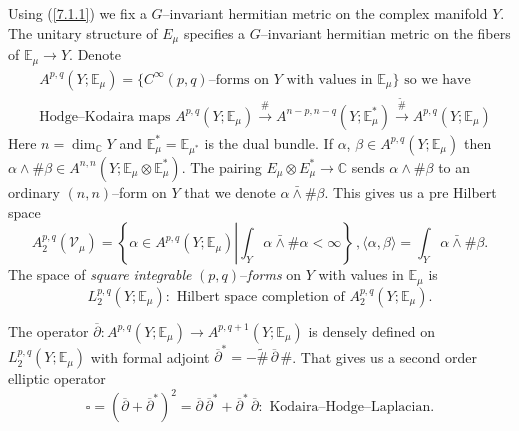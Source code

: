 \documentclass{conm-p-l}
\def\C{\mathbb{C}}
\def\E{\mathbb{E}}
\def\cV{\mathcal{V}}
\begin{document}
Using (\ref{7.1.1}) we fix a $G$--invariant hermitian metric on the complex
manifold $Y$.  The unitary structure of $E_\mu$ specifies a
$G$--invariant hermitian metric on the fibers of $\E_\mu \to Y$.  Denote
\begin{equation}\label{7.1.5}
\begin{aligned}
&A^{p,q}(Y;\E_\mu) = \{ C^\infty (p,q)\text{--forms on }
	Y \text{ with values in } \E_\mu\} \text{ so we have }\\
&\text{Hodge--Kodaira maps 
	$A^{p,q}(Y;\E_\mu) \overset{\#}{\to} A^{n-p,n-q}(Y;\E_\mu^*)
	\overset{\widetilde{\#}}{\to} A^{p,q}(Y;\E_\mu)$}
\end{aligned}
\end{equation}
Here $n = \dim_\C Y$ and $\E_\mu^* = \E_{\mu^*}$ is the dual bundle.  If
$\alpha$, $\beta \in A^{p,q}(Y;\E_\mu)$ then $\alpha \wedge \#\beta \in
A^{n,n}(Y;\E_\mu \otimes \E_\mu^*)$.  The pairing $E_\mu \otimes E_\mu^* \to \C$
sends $\alpha \wedge \#\beta$ to an ordinary $(n,n)$--form on $Y$ that we
denote $\alpha \bar\wedge \#\beta$.  This gives us a pre Hilbert space
\begin{equation}\label{7.1.6}
A_2^{p,q}(\cV_\mu) = \left \{ \alpha \in A^{p,q}(Y;\E_\mu)
	\left | \int_Y \alpha \bar\wedge \#\alpha < \infty \right . \right \}\,,
\langle \alpha , \beta \rangle =
	\int_Y \alpha \bar\wedge \#\beta.
\end{equation}
The space of {\em square integrable} 
$(p,q)$--{\em forms} on $Y$ with values in $\E_\mu$ is
\begin{equation}\label{7.1.6c}
L_2^{p,q}(Y;\E_\mu): \text{ Hilbert space completion of } A_2^{p,q}(Y;\E_\mu).
\end{equation}

The operator $\overline{\partial}: A^{p,q}(Y;\E_\mu) \to A^{p,q+1}(Y;\E_\mu)$
is densely defined on $L_2^{p,q}(Y;\E_\mu)$ with formal adjoint
$\overline{\partial}^* = - \widetilde{\#}\,\overline{\partial}\,\#$. 
That gives us a second order elliptic operator 
\begin{equation}\label{7.1.7}
\square = (\overline{\partial} + \overline{\partial}^*)^2
	= \overline{\partial}\,\overline{\partial}^* + \overline{\partial}^*
	\,\overline{\partial}: \text{ Kodaira--Hodge--Laplacian.}
\end{equation}
\end{document}

